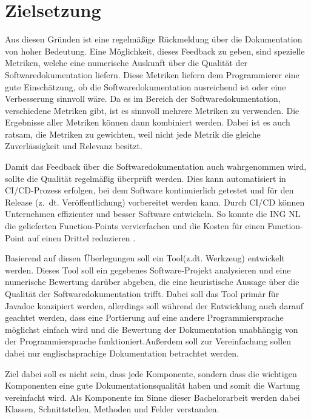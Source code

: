\section{Zielsetzung}
Aus diesen Gründen ist eine regelmäßige Rückmeldung über die Dokumentation von hoher Bedeutung. Eine Möglichkeit, dieses Feedback zu geben, sind spezielle Metriken, welche eine numerische Auskunft über die Qualität der Softwaredokumentation liefern. Diese Metriken liefern dem Programmierer eine gute Einschätzung, ob die Softwaredokumentation ausreichend ist oder eine Verbesserung sinnvoll wäre. Da es im Bereich der Softwaredokumentation, verschiedene Metriken gibt, ist es sinnvoll mehrere Metriken zu verwenden. Die Ergebnisse aller Metriken können dann kombiniert werden. Dabei ist es auch ratsam, die Metriken zu gewichten, weil nicht jede Metrik die gleiche Zuverlässigkeit und Relevanz besitzt.

Damit das Feedback über die Softwaredokumentation auch wahrgenommen wird, sollte die Qualität regelmäßig  überprüft werden. Dies kann automatisiert in \ac{CI/CD}-Prozess erfolgen, bei dem Software kontinuierlich getestet und für den Release (z.~dt. Veröffentlichung) vorbereitet werden kann. Durch CI/CD können Unternehmen effizienter und besser Software entwickeln. So konnte die ING NL die gelieferten Function-Points vervierfachen und die Kosten für einen Function-Point auf einen Drittel reduzieren \cite[S. 520]{Vassallo2016}.

Basierend auf diesen Überlegungen soll ein Tool(z.dt. Werkzeug) entwickelt werden. Dieses Tool soll ein gegebenes Software-Projekt analysieren und eine numerische Bewertung darüber abgeben, die eine heuristische Aussage über die Qualität der Softwaredokumentation trifft.  Dabei soll das Tool primär für Javadoc konzipiert werden, allerdings soll während der Entwicklung auch darauf geachtet werden, dass eine Portierung auf eine andere Programmiersprache möglichst einfach wird und die Bewertung der Dokumentation unabhängig von der Programmiersprache funktioniert.Außerdem soll zur Vereinfachung sollen dabei nur englischsprachige Dokumentation betrachtet werden.

Ziel dabei soll es nicht sein, dass jede Komponente, sondern dass die wichtigen Komponenten eine gute Dokumentationsqualität haben und somit die Wartung vereinfacht wird.  Als Komponente im Sinne dieser Bachelorarbeit werden dabei Klassen, Schnittstellen, Methoden und Felder verstanden. 



